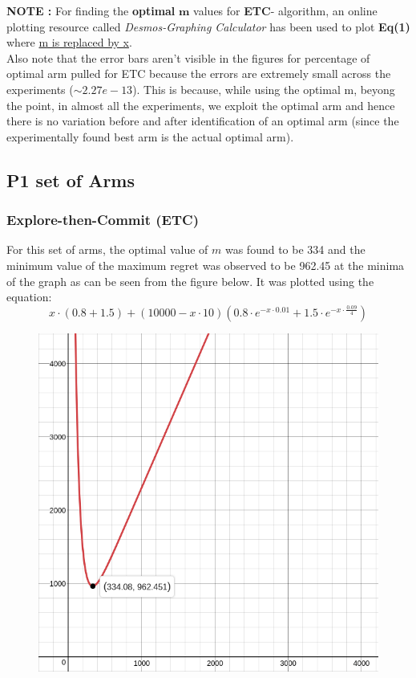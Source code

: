 \documentclass[12pt]{report}
\begin{document}
	\noindent \textbf{NOTE :} For finding the \textbf{optimal} $\boldsymbol{m}$ values for \textbf{ETC}- algorithm, an online plotting resource called \textit{Desmos-Graphing Calculator} has been used to plot \textbf{Eq(1)} where \underline{m is replaced by x}.\\
	
	\noindent Also note that the error bars aren't visible in the figures for percentage of optimal arm pulled for ETC because the errors are extremely small across the experiments ($\sim 2.27e-13$). This is because, while using the optimal m, beyong the point, in almost all the experiments, we exploit the optimal arm and hence there is no variation before and after identification of an optimal arm (since the experimentally found best arm is the actual optimal arm).
	
	\subsection{P1 set of Arms}
		\subsubsection{Explore-then-Commit (ETC)}
			For this set of arms, the optimal value of $m$ was found to be 334 and the minimum value of the maximum regret was observed to be 962.45 at the minima of the graph as can be seen from the figure below. It was plotted using the equation:
			$$x\cdot\left(0.8+1.5\right)+\left(10000-x\cdot10\right)\left(0.8\cdot e^{-x\cdot0.01}+1.5\cdot e^{-x\cdot\frac{0.09}{4}}\right)$$
			
			\begin{figure}[H]
				\includegraphics[scale=0.5]{Figures/m_P1.png}
			\end{figure}
			
\end{document}
